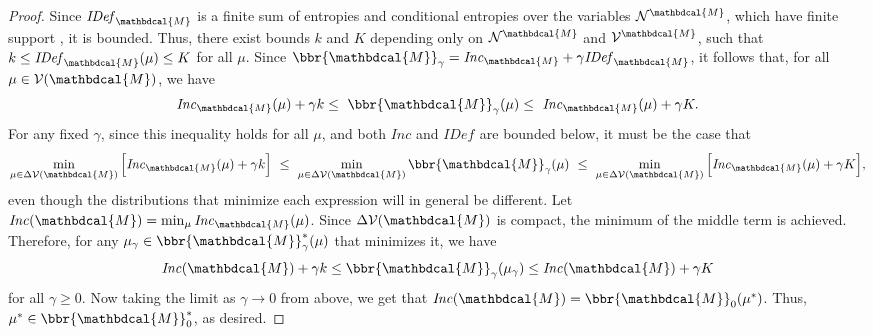 \documentclass{article}
\theoremstyle{plain}
\theoremstyle{definition}
\theoremstyle{remark}
\newcommand{\commentout}[1]{\ignorespaces}
\newcommand{\V}{\mathcal V}
\newcommand{\N}{\mathcal N}
\newcommand{\dg}[1]{\mathbdcal{#1}}
\newcommand{\IDef}[1]{\mathit{IDef}_{#1}}
\newcommand\Inc{\mathit{Inc}}
\numberwithin{equation}{section}
\begin{document}
\begin{proof}
\def\lb{k}
\def\ub{K}  

Since $\IDef{\dg M}$ is a finite sum of entropies
and conditional entropies over the variables $\N^{\dg M}$, which have finite support%
, it is bounded.
Thus, there exist bounds $k$ and $K$ depending only on $\N^{\dg M}$ and
$\V^{\dg M}$, such that $\lb \leq \IDef{\dg M}(\mu) \leq \ub$ for all $\mu$.
%
Since $\bbr{\dg M}_\gamma = \Inc_{\dg M} + \gamma \IDef{\dg M}$,
it follows that, for all $\mu \in \V(\dg M)$, we have
\[ \Inc_{\dg M}( \mu) + \gamma\lb \leq~ \bbr{\dg M }_\gamma(\mu) 
\leq~  \Inc_{\dg M}( \mu) + \gamma\ub. \]
For any fixed $\gamma$, since this inequality holds for all $\mu$, and
both $\Inc$ and $\IDef{}$ are bounded below, it must be the case that  
\[
\min_{\mu \in \Delta\V(\dg M)} \Big[ \Inc_{\dg M}( \mu) + \gamma\lb \Big]
~\leq~ \min_{\mu \in \Delta\V(\dg M)}\bbr{\dg M }_\gamma(\mu) ~\leq~
\min_{\mu \in \Delta\V(\dg M)} \Big[ \Inc_{\dg M}( \mu) + \gamma\ub
    \Big], \] 
even though the distributions that minimize each expression will in general be different.
Let $\Inc(\dg M) = \min_{\mu} \Inc_{\dg M}(\mu)$.
Since $\Delta\V(\dg M)$ is compact, the minimum of the middle term is
achieved.  
Therefore, for any $\mu_\gamma \in \bbr{\dg M}^*_\gamma(\mu)$ that minimizes it, we have
$$\Inc(\dg M) +\gamma \lb \le \bbr{\dg M }_\gamma(\mu_\gamma) \le
		 \Inc(\dg M) +\gamma \ub$$ for all $\gamma \ge 0.$
Now taking the limit as $\gamma\rightarrow 0$ from above, we get that
$\Inc(\dg M) = \bbr{\dg M }_0(\mu^*)$.
Thus, $\mu^* \in \bbr{\dg M}_0^*$, as desired.
\commentout{

}
\end{proof}
\end{document}
